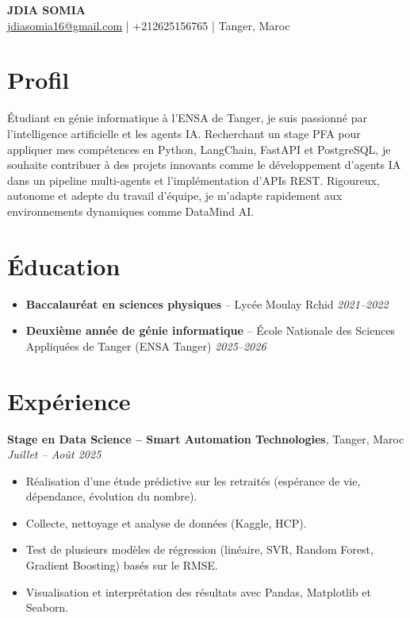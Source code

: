 \documentclass[a4paper,11pt]{article}
\begin{document}
\begin{center}
    {\Huge \textbf{JDIA SOMIA}} \\[6pt]
    \href{mailto:jdiasomia16@gmail.com}{jdiasomia16@gmail.com} \quad|\quad
    +212625156765 \quad|\quad
    Tanger, Maroc
\end{center}

\vspace{6pt}

\section*{Profil}
Étudiant en génie informatique à l'ENSA de Tanger, je suis passionné par l'intelligence artificielle et les agents IA. Recherchant un stage PFA pour appliquer mes compétences en Python, LangChain, FastAPI et PostgreSQL, je souhaite contribuer à des projets innovants comme le développement d'agents IA dans un pipeline multi-agents et l'implémentation d'APIs REST. Rigoureux, autonome et adepte du travail d'équipe, je m'adapte rapidement aux environnements dynamiques comme DataMind AI.

\section*{Éducation}
\begin{itemize}[leftmargin=*, noitemsep]
    \item \textbf{Baccalauréat en sciences physiques} – Lycée Moulay Rchid \hfill \textit{2021–2022}
    \item \textbf{Deuxième année de génie informatique} – École Nationale des Sciences Appliquées de Tanger (ENSA Tanger) \hfill \textit{2025–2026}
\end{itemize}

\section*{Expérience}

\textbf{Stage en Data Science – Smart Automation Technologies}, Tanger, Maroc \hfill \textit{Juillet – Août 2025}
\begin{itemize}[leftmargin=*, noitemsep]
    \item Réalisation d'une étude prédictive sur les retraités (espérance de vie, dépendance, évolution du nombre).
    \item Collecte, nettoyage et analyse de données (Kaggle, HCP).
    \item Test de plusieurs modèles de régression (linéaire, SVR, Random Forest, Gradient Boosting) basés sur le RMSE.
    \item Visualisation et interprétation des résultats avec Pandas, Matplotlib et Seaborn.
\end{itemize}
\end{document}
